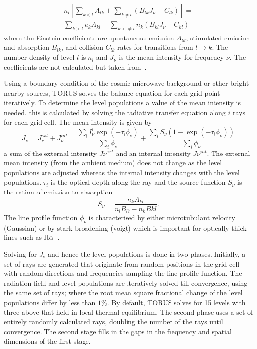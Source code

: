 \documentclass[fleqn,usenatbib]{mnras}
\begin{document}
\begin{multline}
n_{l}\left[ \sum_{k<l}A_{lk} + \sum_{k\neq l}\left( B_{lk}J_{\nu} +C_{lk}\right)\right] = \\
\sum_{k>l}n_{k}A_{kl} + \sum_{k<\neq l} n_{k}\left(B_{kl}J_{\nu}+C_{kl} \right)
\label{eq:balance}
\end{multline}
where the Einstein coefficients are spontaneous emission $A_{lk}$, stimulated emission and absorption $B_{lk}$, and collision $C_{lk}$ rates for transitions from $l\rightarrow k$. The number density of level $l$ is $n_l$ and $J_{\nu}$ is the mean intensity for frequency $\nu$. The coefficients are not calculated but taken from~\citet{Schoier:2005ja}.

Using a boundary condition of the cosmic microwave background or other bright nearby sources, TORUS solves the balance equation for each grid point iteratively. To determine the level populations a value of the mean intensity is needed, this is calculated by solving the radiative transfer equation along $i$ rays for each grid cell. The mean intensity is given by
\begin{equation}
    J_{\nu}=J_{\nu}^{ext}+J_{\nu}^{int}=\frac{\sum_{i}I_{\nu}^{i}\exp{\left(-\tau_{i}\phi_{\nu}\right)}}{\sum_{i}\phi_{\nu}}+\frac{\sum_{i}S_{\nu}\left(1-\exp{\left(-\tau_{i}\phi_{\nu}\right)}\right)}{\sum_{i}\phi_{\nu}}
    \label{eq:meanintensity}
\end{equation}
a sum of the external intensity $J{\nu}^{ext}$ and an internal intensity $J{\nu}^{int}$. The external mean intensity (from the ambient medium) does not change as the level populations are adjusted whereas the internal intensity changes with the level populations. $\tau_{i}$ is the optical depth along the ray and the source function $S_{\nu}$ is the ration of emission to absorption
\begin{equation}
    S_{\nu}=\frac{n_{k}A_{kl}}{n_{l}B_{lk}-n_{k}B{kl}}.
    \label{eq:sourcefunction}
\end{equation}
The line profile function $\phi_{\nu}$ is characterised by either microtubulant velocity (Gaussian) or by stark broadening (voigt) which is important for optically thick lines such as ${\rm H}\alpha$~\citep{Kurosawa:2011fh}.

Solving for $J_{\nu}$ and hence the level populations is done in two phases. Initially, a set of rays are generated that originate from random positions in the grid cell with random directions and frequencies sampling the line profile function. The radiation field and level populations are iteratively solved till convergence, using the same set of rays; where the root mean square fractional change of the level populations differ by less than $1\%$. By default, TORUS solves for 15 levels with three above that held in local thermal equilibrium. The second phase uses a set of entirely randomly calculated rays, doubling the number of the rays until convergence. The second stage fills in the gaps in the frequency and spatial dimensions of the first stage. 
\end{document}
